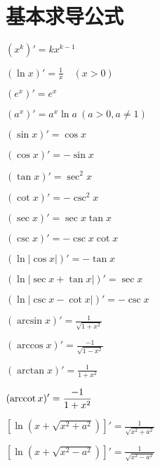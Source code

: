 \section{基本求导公式}

\begin{multicols}{2}
    \begin{spacing}{\hangju}
        \noindent $(x^k)' = kx^{k-1}$

        \noindent $(\ln x)' = \frac{1}{x} \quad (x > 0)$

        \noindent $(e^x)' = e^x$

        \noindent $\displaystyle (a^x)' = a^x\ln{a} \  (a > 0, a \neq 1)$

        \noindent $\displaystyle (\sin{x})' = \cos{x}$

        \noindent $\displaystyle (\cos{x})' = -\sin{x}$

        \noindent $\displaystyle (\tan{x})' = \sec^2{x}$

        \noindent $\displaystyle (\cot{x})' = -\csc^2{x}$

        \noindent $\displaystyle (\sec{x})' = \sec{x}\tan{x}$

        \noindent $\displaystyle (\csc{x})' = -\csc{x}\cot{x}$

        \noindent $\displaystyle (\ln{\left| \cos{x} \right|})' = -\tan{x}$

        \noindent $\displaystyle (\ln{\left| \sec{x} + \tan{x} \right|})' = \sec{x}$

        \noindent $\displaystyle (\ln{\left| \csc{x} - \cot{x} \right|})' = -\csc{x}$

        \noindent $\displaystyle (\arcsin{x})' = \frac{1}{\sqrt{1 + x^2}}$

        \noindent $\displaystyle (\arccos{x})' = \frac{-1}{\sqrt{1 - x^2}}$

        \noindent $\displaystyle (\arctan{x})' = \frac{1}{1 + x^2}$

        \noindent $\displaystyle ( \operatorname{arccot}{x})' = \frac{-1}{1 + x^2}$

        \noindent $\displaystyle [\ln{(x + \sqrt{x^2 + a^2})}]' = \frac{1}{\sqrt{x^2 + a^2}}$

        \noindent $\displaystyle [\ln{(x + \sqrt{x^2 - a^2})}]' = \frac{1}{\sqrt{x^2 - a^2}}$
    \end{spacing}
\end{multicols}

